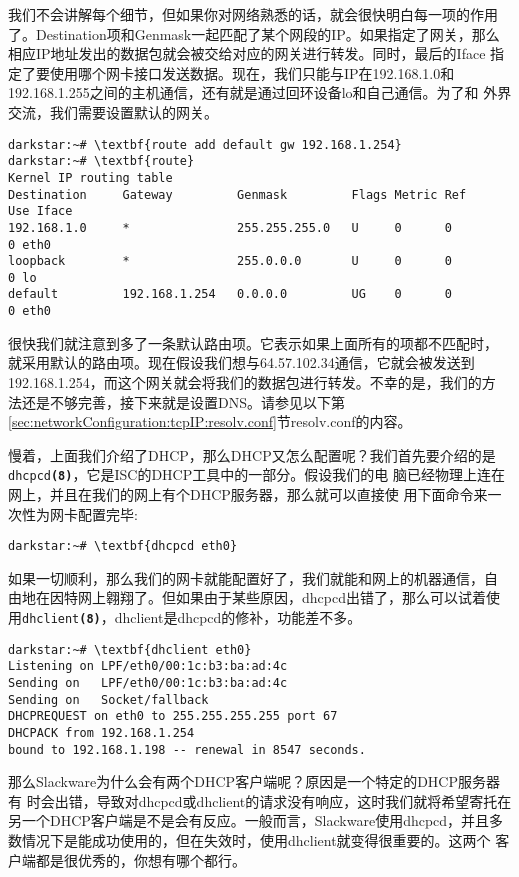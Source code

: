 我们不会讲解每个细节，但如果你对网络熟悉的话，就会很快明白每一项的作用
了。Destination项和Genmask一起匹配了某个网段的IP。如果指定了网关，那么
相应IP地址发出的数据包就会被交给对应的网关进行转发。同时，最后的Iface
指定了要使用哪个网卡接口发送数据。现在，我们只能与IP在192.168.1.0和
192.168.1.255之间的主机通信，还有就是通过回环设备lo和自己通信。为了和
外界交流，我们需要设置默认的网关。
\begin{Verbatim}[frame=single,commandchars=\\\{\}]
darkstar:~# \textbf{route add default gw 192.168.1.254}
darkstar:~# \textbf{route}
Kernel IP routing table
Destination     Gateway         Genmask         Flags Metric Ref    Use Iface
192.168.1.0     *               255.255.255.0   U     0      0        0 eth0
loopback        *               255.0.0.0       U     0      0        0 lo
default         192.168.1.254   0.0.0.0         UG    0      0        0 eth0
\end{Verbatim}
很快我们就注意到多了一条默认路由项。它表示如果上面所有的项都不匹配时，
就采用默认的路由项。现在假设我们想与64.57.102.34通信，它就会被发送到
192.168.1.254，而这个网关就会将我们的数据包进行转发。不幸的是，我们的方
法还是不够完善，接下来就是设置DNS。请参见以下第
\ref{sec:networkConfiguration:tcpIP:resolv.conf}节resolv.conf的内容。

慢着，上面我们介绍了DHCP，那么DHCP又怎么配置呢？我们首先要介绍的是
\texttt{dhcpcd\textbf{(8)}}，它是ISC的DHCP工具中的一部分。假设我们的电
脑已经物理上连在网上，并且在我们的网上有个DHCP服务器，那么就可以直接使
用下面命令来一次性为网卡配置完毕:
\begin{Verbatim}[frame=single,commandchars=\\\{\}]
darkstar:~# \textbf{dhcpcd eth0}
\end{Verbatim}

如果一切顺利，那么我们的网卡就能配置好了，我们就能和网上的机器通信，自
由地在因特网上翱翔了。但如果由于某些原因，dhcpcd出错了，那么可以试着使
用\texttt{dhclient\textbf{(8)}}，dhclient是dhcpcd的修补，功能差不多。
\begin{Verbatim}[frame=single,commandchars=\\\{\}]
darkstar:~# \textbf{dhclient eth0}
Listening on LPF/eth0/00:1c:b3:ba:ad:4c
Sending on   LPF/eth0/00:1c:b3:ba:ad:4c
Sending on   Socket/fallback
DHCPREQUEST on eth0 to 255.255.255.255 port 67
DHCPACK from 192.168.1.254
bound to 192.168.1.198 -- renewal in 8547 seconds.
\end{Verbatim}

那么Slackware为什么会有两个DHCP客户端呢？原因是一个特定的DHCP服务器有
时会出错，导致对dhcpcd或dhclient的请求没有响应，这时我们就将希望寄托在
另一个DHCP客户端是不是会有反应。一般而言，Slackware使用dhcpcd，并且多
数情况下是能成功使用的，但在失效时，使用dhclient就变得很重要的。这两个
客户端都是很优秀的，你想有哪个都行。

